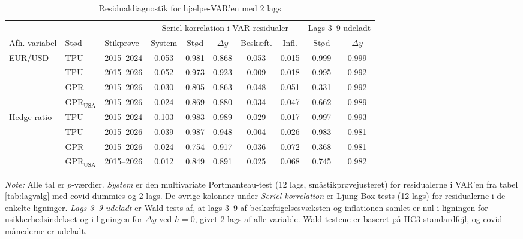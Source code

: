 \begin{table}[H]
\centering
\caption{Residualdiagnostik for hjælpe-VAR'en med 2 lags}
\label{tab:lagdiag}
\begin{threeparttable}
\begin{tabular}{lll ccccc cc}
\toprule
 & & & \multicolumn{5}{c}{Seriel korrelation i VAR-residualer} & \multicolumn{2}{c}{Lags 3--9 udeladt} \\
\cmidrule(lr){4-8} \cmidrule(lr){9-10}
Afh. variabel & Stød & Stikprøve & System & Stød & $\Delta y$ & Beskæft. & Infl. & Stød & $\Delta y$ \\
\midrule
EUR/USD & TPU & 2015--2024 & 0.053 & 0.981 & 0.868 & 0.053 & 0.015 & 0.999 & 0.999 \\
 & TPU & 2015--2026 & 0.052 & 0.973 & 0.923 & 0.009 & 0.018 & 0.995 & 0.992 \\
 & GPR & 2015--2026 & 0.030 & 0.805 & 0.863 & 0.048 & 0.051 & 0.331 & 0.992 \\
 & $\text{GPR}_{\text{USA}}$ & 2015--2026 & 0.024 & 0.869 & 0.880 & 0.034 & 0.047 & 0.662 & 0.989 \\
\addlinespace
Hedge ratio & TPU & 2015--2024 & 0.103 & 0.983 & 0.989 & 0.029 & 0.017 & 0.997 & 0.993 \\
 & TPU & 2015--2026 & 0.039 & 0.987 & 0.948 & 0.004 & 0.026 & 0.983 & 0.981 \\
 & GPR & 2015--2026 & 0.024 & 0.754 & 0.917 & 0.036 & 0.072 & 0.368 & 0.981 \\
 & $\text{GPR}_{\text{USA}}$ & 2015--2026 & 0.012 & 0.849 & 0.891 & 0.025 & 0.068 & 0.745 & 0.982 \\
\bottomrule
\end{tabular}
\begin{tablenotes}[flushleft]\footnotesize
\item \textit{Note:} Alle tal er $p$-værdier. \textit{System} er den multivariate
Portmanteau-test (12 lags, småstikprøvejusteret) for residualerne i VAR'en fra tabel
\ref{tab:lagvalg} med covid-dummies og 2 lags. De øvrige kolonner under
\textit{Seriel korrelation} er Ljung-Box-tests (12 lags) for residualerne i de enkelte
ligninger. \textit{Lags 3--9 udeladt} er Wald-tests af, at lags 3--9 af beskæftigelsesvæksten
og inflationen samlet er nul i ligningen for usikkerhedsindekset og i ligningen for
$\Delta y$ ved $h=0$, givet 2 lags af alle variable. Wald-testene er baseret på
HC3-standardfejl, og covid-månederne er udeladt.
\end{tablenotes}
\end{threeparttable}
\end{table}